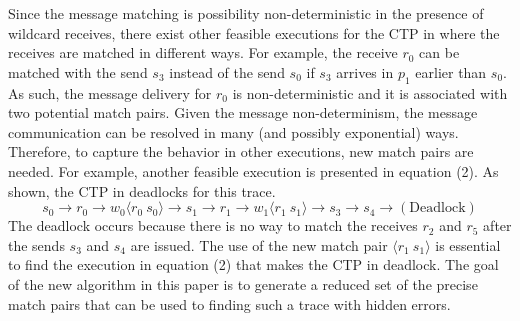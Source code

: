 
Since the message matching is possibility non-deterministic in the presence of wildcard receives, there exist other feasible executions for the CTP in  where the receives are matched in different ways. For example,  the receive $r_0$ can be matched with the send $s_3$ instead of the send $s_0$ if $s_3$ arrives in $p_1$ earlier than $s_0$. As such, the message delivery for $r_0$ is non-deterministic and it is associated with two potential match pairs. 
Given the message non-determinism, the message communication can be resolved in many (and possibly exponential) ways. 
Therefore, to capture the behavior in other executions, new match pairs are needed.
For example, another feasible execution is presented in equation (2). As shown, the CTP in  deadlocks for this trace. 
\begin{equation}
s_0\rightarrow r_0\rightarrow w_0\langle r_0\ s_0\rangle \rightarrow s_1\rightarrow r_1\rightarrow w_1\langle r_1\ s_1\rangle \rightarrow s_3\rightarrow s_4 \rightarrow (\mathrm{Deadlock})
\end{equation} 
The deadlock occurs because there is no way to match the receives $r_2$ and $r_5$ after the sends $s_3$ and $s_4$ are issued. The use of the new match pair $\langle r_1\ s_1\rangle$ is essential to find the execution in equation (2) that makes the CTP in  deadlock.
The goal of the new algorithm in this paper is to generate a reduced set of the precise match pairs that can be used to finding such a trace with hidden errors.



